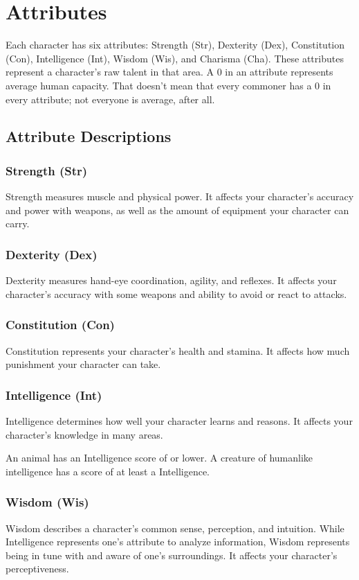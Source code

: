 \chapter{Attributes}
Each character has six attributes: Strength (Str), Dexterity (Dex), Constitution (Con), Intelligence (Int), Wisdom (Wis), and Charisma (Cha). These attributes represent a character's raw talent in that area. A 0 in an attribute represents average human capacity. That doesn't mean that every commoner has a 0 in every attribute; not everyone is average, after all.

\section{Attribute Descriptions}

\subsection{Strength (Str)}
Strength measures muscle and physical power. It affects your character's accuracy and power with weapons, as well as the amount of equipment your character can carry.

\subsection{Dexterity (Dex)}
Dexterity measures hand-eye coordination, agility, and reflexes. It affects your character's accuracy with some weapons and ability to avoid or react to attacks.

\subsection{Constitution (Con)}
Constitution represents your character's health and stamina. It affects how much punishment your character can take.

\subsection{Intelligence (Int)}
Intelligence determines how well your character learns and reasons. It affects your character's knowledge in many areas.

\par An animal has an Intelligence score of  or lower. A creature of humanlike intelligence has a score of at least a  Intelligence.

\subsection{Wisdom (Wis)}
Wisdom describes a character's common sense, perception, and intuition. While Intelligence represents one's attribute to analyze information, Wisdom represents being in tune with and aware of one's surroundings. It affects your character's perceptiveness.

